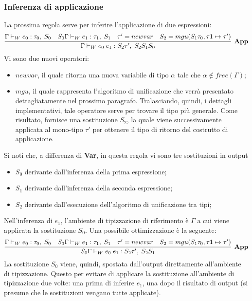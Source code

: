 \documentclass[10pt,a4paper]{article}
\begin{document}
\hypertarget{Inferenza di applicazione}{\subsubsection{Inferenza di applicazione}}
La prossima regola serve per inferire l'applicazione di due espressioni:
\[ \infer[\textbf{App}]{\Gamma \vdash_W e_0 \; e_1 : S_2\tau', \; S_2S_1S_0}{\Gamma \vdash_W e_0 : \tau_0, \; S_0 & S_0\Gamma \vdash_W e_1 : \tau_1, \; S_1 & \tau' = newvar & S_2 = mgu(S_1\tau_0, \tau1 \mapsto \tau')} \]
Vi sono due nuovi operatori:
\begin{itemize}
    \item $ newvar $, il quale ritorna una nuova variabile di tipo $ \alpha $ tale che $ \alpha \notin free(\Gamma) $;
    \item $ mgu $, il quale rappresenta l'algoritmo di unificazione che verrà presentato dettagliatamente nel prossimo
    paragrafo. Tralasciando, quindi, i dettagli implementativi, tale operatore serve per trovare il tipo più generale.
    Come risultato, fornisce una sostituzione $ S_2 $, la quale viene successivamente applicata al mono-tipo $ \tau' $
    per ottenere il tipo di ritorno del costrutto di applicazione.
\end{itemize}
Si noti che, a differenza di \textbf{Var}, in questa regola vi sono tre sostituzioni in output
\begin{itemize}
    \item $ S_0 $ derivante dall'inferenza della prima espressione;
    \item $ S_1 $ derivante dall'inferenza della seconda espressione;
    \item $ S_2 $ derivante dall'esecuzione dell'algoritmo di unificazione tra tipi;
\end{itemize}
Nell'inferenza di $ e_1 $, l'ambiente di tipizzazione di riferimento è $ \Gamma $ a cui viene applicata la sostituzione
$ S_0 $. Una possibile ottimizzazione è la seguente:
\[ \infer[\textbf{App}]{S_0\Gamma \vdash_W e_0 \; e_1 : S_2\tau', \; S_2S_1}{\Gamma \vdash_W e_0 : \tau_0, \; S_0 & S_0\Gamma \vdash_W e_1 : \tau_1, \; S_1 & \tau' = newvar & S_2 = mgu(S_1\tau_0, \tau1 \mapsto \tau')} \]
La sostituzione $ S_0 $ viene, quindi, spostata dall'output direttamente all'ambiente di tipizzazione. Questo per evitare
di applicare la sostituzione all'ambiente di tipizzazione due volte: una prima di inferire $ e_1 $, una dopo il risultato
di output (si presume che le sostituzioni vengano tutte applicate).
\end{document}
